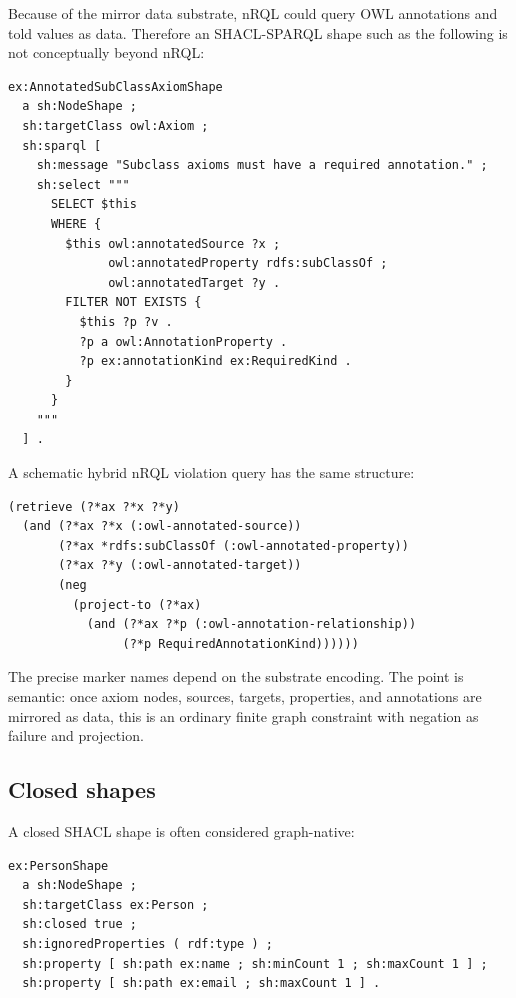 \documentclass[11pt,letterpaper]{article}
\newcommand{\nrql}{nRQL}
\newcommand{\shacl}{SHACL}
\newcommand{\naf}{negation as failure}
\newcommand{\owl}{OWL}
\begin{document}
Because of the mirror data substrate, \nrql{} could query \owl{} annotations and told values as data. Therefore an \shacl{}-SPARQL shape such as the following is not conceptually beyond \nrql{}:

\begin{lstlisting}[language=turtle,caption={SHACL-SPARQL shape for required annotations on subclass axioms.}]
ex:AnnotatedSubClassAxiomShape
  a sh:NodeShape ;
  sh:targetClass owl:Axiom ;
  sh:sparql [
    sh:message "Subclass axioms must have a required annotation." ;
    sh:select """
      SELECT $this
      WHERE {
        $this owl:annotatedSource ?x ;
              owl:annotatedProperty rdfs:subClassOf ;
              owl:annotatedTarget ?y .
        FILTER NOT EXISTS {
          $this ?p ?v .
          ?p a owl:AnnotationProperty .
          ?p ex:annotationKind ex:RequiredKind .
        }
      }
    """
  ] .
\end{lstlisting}

A schematic hybrid \nrql{} violation query has the same structure:

\begin{lstlisting}[language=nrql,caption={Schematic nRQL version over a mirrored OWL substrate.}]
(retrieve (?*ax ?*x ?*y)
  (and (?*ax ?*x (:owl-annotated-source))
       (?*ax *rdfs:subClassOf (:owl-annotated-property))
       (?*ax ?*y (:owl-annotated-target))
       (neg
         (project-to (?*ax)
           (and (?*ax ?*p (:owl-annotation-relationship))
                (?*p RequiredAnnotationKind))))))
\end{lstlisting}

The precise marker names depend on the substrate encoding. The point is semantic: once axiom nodes, sources, targets, properties, and annotations are mirrored as data, this is an ordinary finite graph constraint with \naf{} and projection.

\subsection{Closed shapes}

A closed \shacl{} shape is often considered graph-native:

\begin{lstlisting}[language=turtle]
ex:PersonShape
  a sh:NodeShape ;
  sh:targetClass ex:Person ;
  sh:closed true ;
  sh:ignoredProperties ( rdf:type ) ;
  sh:property [ sh:path ex:name ; sh:minCount 1 ; sh:maxCount 1 ] ;
  sh:property [ sh:path ex:email ; sh:maxCount 1 ] .
\end{lstlisting}
\end{document}
